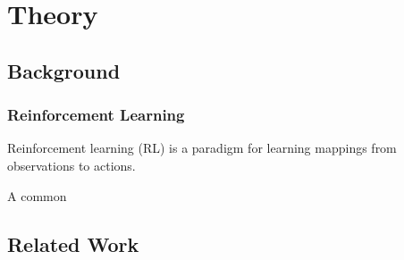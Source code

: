 \section{Theory}

\subsection{Background}

\begin{frame}
    \frametitle{Reinforcement Learning}

    Reinforcement learning (RL) is a paradigm for learning mappings from observations to actions.
    
    A common 
\end{frame}

\subsection{Related Work}